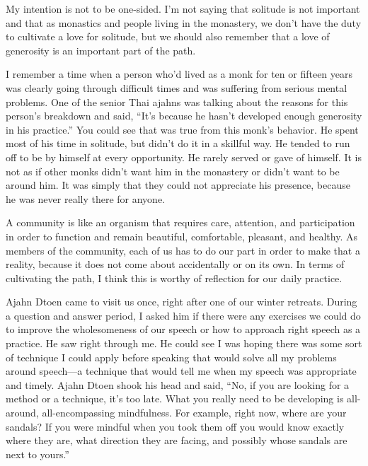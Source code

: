 My intention is not to be one-sided. I'm not saying that solitude is 
not important and that as monastics and people living in the monastery, 
we don't have the duty to cultivate a love for solitude, but we should 
also remember that a love of generosity is an important part of the 
path.

I remember a time when a person who'd lived as a monk for ten or 
fifteen years was clearly going through difficult times and was 
suffering from serious mental problems. One of the senior Thai ajahns 
was talking about the reasons for this person's breakdown and said, 
``It's because he hasn't developed enough generosity in his practice.'' 
You could see that was true from this monk's behavior. He spent most of 
his time in solitude, but didn't do it in a skillful way. He tended to 
run off to be by himself at every opportunity. He rarely served or gave 
of himself. It is not as if other monks didn't want him in the 
monastery or didn't want to be around him. It was simply that they 
could not appreciate his presence, because he was never really there 
for anyone.

A community is like an organism that requires care, attention, and 
participation in order to function and remain beautiful, comfortable, 
pleasant, and healthy. As members of the community, each of us has to 
do our part in order to make that a reality, because it does not come 
about accidentally or on its own. In terms of cultivating the path, I 
think this is worthy of reflection for our daily practice.


Ajahn Dtoen came to visit us once, right after one of our winter 
retreats. During a question and answer period, I asked him if there 
were any exercises we could do to improve the wholesomeness of our 
speech or how to approach right speech as a practice. He saw right 
through me. He could see I was hoping there was some sort of technique 
I could apply before speaking that would solve all my problems around 
speech---a technique that would tell me when my speech was appropriate 
and timely. Ajahn Dtoen shook his head and said, ``No, if you are 
looking for a method or a technique, it's too late. What you really 
need to be developing is all-around, all-encompassing mindfulness. For 
example, right now, where are your sandals? If you were mindful when 
you took them off you would know exactly where they are, what direction 
they are facing, and possibly whose sandals are next to yours.''


